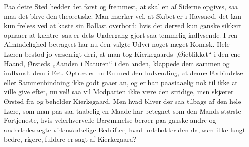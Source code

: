 Paa dette Sted hedder det først og fremmest, at skal en af Siderne opgives,
saa maa det blive den
theoretiske. Man mærker vel, at Skibet er i Havsnød, det kan kun
frelses ved at kaste sin Ballast overbord: hvis det derved kun ganske sikkert
opnaaer at kæntre, saa er dets Undergang gjort saa temmelig indlysende. I ren
Almindelighed betragtet har nu den valgte Udvei noget meget Komisk. Hele
Læren bestod jo væsenligt deri, at man tog Kierkegaards „Øieblikket“ i den ene
Haand, Ørsteds „Aanden i Naturen“ i den anden, klappede dem sammen og indbandt
dem i Eet. Optræder nu En med den Indvending, at denne Forbindelse eller
Sammenbindning ikke godt gaaer an, og er han paastaaelig nok til ikke at ville
give efter, nu vel! saa vil Modparten ikke være den stridige, men skjærer
Ørsted fra og beholder Kierkegaard. Men hvad bliver der saa tilbage af den
hele Lære, som man paa saa taabelig en Maade har betegnet som den Mands
største Fortjeneste, hvis velerhvervede Berømmelse beroer paa ganske andre og
anderledes ægte videnskabelige Bedrifter, hvad indeholder den da, som ikke
langt bedre, rigere, fuldere er sagt af Kierkegaard?

